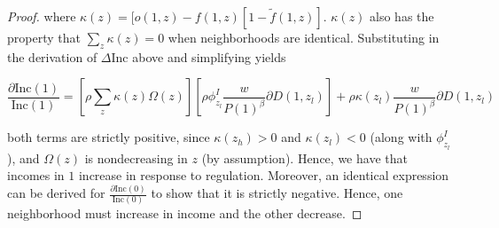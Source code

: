 \documentclass[12pt]{article}
\begin{document}
\begin{enumerate}
\begin{proof}
			where $\kappa(z) = [o(1, z) - f(1, z)[1-\tilde{f}(1, z)]$. $\kappa(z)$ also has the property that $\sum_{z}\kappa(z) = 0$ when neighborhoods are identical. Substituting in the derivation of $\Delta \text{Inc}$ above and simplifying yields
			
			\begin{equation*}
				\frac{\partial \text{Inc}(1)}{\text{Inc}(1)} = [\rho \sum_{z}\kappa(z)\Omega(z)][\rho\phi^{I}_{z_{l}}\frac{w}{P(1)^{\beta}}\partial D(1, z_{l})] + \rho\kappa(z_{l})\frac{w}{P(1)^{\beta}}\partial D(1, z_{l})
			\end{equation*} 
			
			both terms are strictly positive, since $\kappa(z_{h}) > 0$ and $\kappa(z_{l}) < 0$ (along with $\phi^{I}_{z_{l}}$), and $\Omega(z)$ is nondecreasing in $z$ (by assumption). Hence, we have that incomes in $1$ increase in response to regulation. Moreover, an identical expression can be derived for $\frac{\partial \text{Inc}(0)}{\text{Inc}(0)}$ to show that it is strictly negative. Hence, one neighborhood must increase in income and the other decrease. 
		
		\end{proof}
		
	\end{enumerate}
	
	 
	
\end{document}
